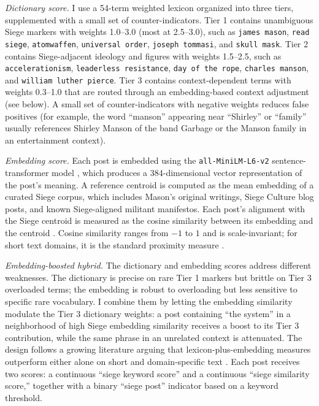 \documentclass[bibtex,autowc,nonblind]{apsr_submission}
\begin{document}
\textit{Dictionary score.} I use a 54-term weighted lexicon organized into three tiers, supplemented with a small set of counter-indicators. Tier 1 contains unambiguous Siege markers with weights 1.0--3.0 (most at 2.5--3.0), such as \texttt{james mason}, \texttt{read siege}, \texttt{atomwaffen}, \texttt{universal order}, \texttt{joseph tommasi}, and \texttt{skull mask}. Tier 2 contains Siege-adjacent ideology and figures with weights 1.5--2.5, such as \texttt{accelerationism}, \texttt{leaderless resistance}, \texttt{day of the rope}, \texttt{charles manson}, and \texttt{william luther pierce}. Tier 3 contains context-dependent terms with weights 0.3--1.0 that are routed through an embedding-based context adjustment (see below). A small set of counter-indicators with negative weights reduces false positives (for example, the word ``manson'' appearing near ``Shirley'' or ``family'' usually references Shirley Manson of the band Garbage or the Manson family in an entertainment context).

\textit{Embedding score.} Each post is embedded using the \texttt{all-MiniLM-L6-v2} sentence-transformer model \citep{reimers2019sentence, devlin:2019}, which produces a 384-dimensional vector representation of the post's meaning. A reference centroid is computed as the mean embedding of a curated Siege corpus, which includes Mason's original writings, Siege Culture blog posts, and known Siege-aligned militant manifestos. Each post's alignment with the Siege centroid is measured as the cosine similarity between its embedding and the centroid \citep{manning2008introduction}. Cosine similarity ranges from $-1$ to $1$ and is scale-invariant; for short text domains, it is the standard proximity measure \citep{grimmer2013text}.

\textit{Embedding-boosted hybrid.} The dictionary and embedding scores address different weaknesses. The dictionary is precise on rare Tier 1 markers but brittle on Tier 3 overloaded terms; the embedding is robust to overloading but less sensitive to specific rare vocabulary. I combine them by letting the embedding similarity modulate the Tier 3 dictionary weights: a post containing ``the system'' in a neighborhood of high Siege embedding similarity receives a boost to its Tier 3 contribution, while the same phrase in an unrelated context is attenuated. The design follows a growing literature arguing that lexicon-plus-embedding measures outperform either alone on short and domain-specific text \citep{rodriguez:2022a}. Each post receives two scores: a continuous ``siege keyword score'' and a continuous ``siege similarity score,'' together with a binary ``siege post'' indicator based on a keyword threshold.
\end{document}
